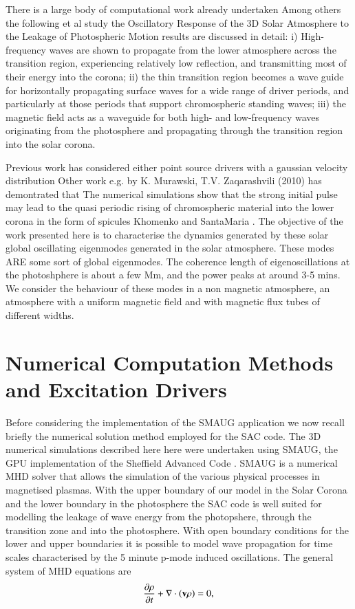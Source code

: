 \documentclass{aa}
\begin{document}
There is a large body of computational work already undertaken Among others the following \cite{Fedun 2009} et al study the Oscillatory Response of the 3D Solar Atmosphere to the Leakage of Photospheric Motion results are discussed in detail: i) High-frequency waves are shown to propagate from the lower atmosphere across the transition region, experiencing relatively low reflection, and transmitting most of their energy into the corona; ii) the thin transition region becomes a wave guide for horizontally propagating surface waves for a wide range of driver periods, and particularly at those periods that support chromospheric standing waves; iii) the magnetic field acts as a waveguide for both high- and low-frequency waves originating from the photosphere and propagating through the transition region into the solar corona.

Previous work has considered either point source drivers with a gaussian velocity distribution Other work e.g. by K. Murawski, T.V. Zaqarashvili (2010) \cite{Murawski2010} has demontrated that The numerical simulations show that the strong initial pulse may lead to the quasi periodic rising of chromospheric material into the lower corona in the form of spicules Khomenko and SantaMaria \cite{Khomenko2012}. The objective of the work presented here  is to characterise the dynamics generated by these solar global oscillating eigenmodes generated in the solar atmosphere.  These modes ARE some sort of global eigenmodes. The coherence length of eigenoscillations at the photoshphere is about a few Mm, and the power peaks at around 3-5 mins. We consider the behaviour of these modes in a non magnetic atmosphere, an atmosphere with a uniform magnetic field and with magnetic flux tubes of different widths.






\section{Numerical Computation Methods and Excitation Drivers}
Before considering the implementation of the SMAUG application we now recall briefly the numerical solution method employed for the SAC code.  The 3D numerical simulations described here here were undertaken using SMAUG, the GPU implementation of the Sheffield Advanced Code \cite{Shelyag2008}. SMAUG is a numerical MHD solver that allows the simulation of the various physical processes in magnetised plasmas.  With the upper boundary of our model in the Solar Corona and the lower boundary in the photosphere the SAC code is well suited for modelling the leakage of wave energy from the photopshere, through the transition zone and into the photosphere. With open boundary conditions for the lower and upper boundaries it is possible to model wave propagation for time scales characterised by the 5 minute p-mode induced oscillations. The general system of MHD equations are
\begin{equation}\label{eqdens}
{{\partial \rho}\over{\partial t}}+\nabla\cdot\left( {\bf v}\rho\right)=0,
\end{equation}
\end{document}
